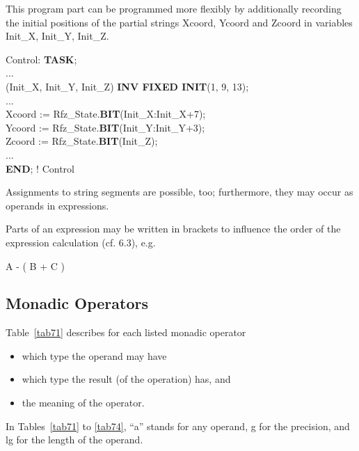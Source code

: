This program part can be programmed more flexibly by additionally
recording the initial positions of the partial strings Xcoord, Ycoord
and Zcoord in variables Init\_X, Init\_Y, Init\_Z.

Control: {\bf TASK};\\
\x ... \\
 (Init\_X, Init\_Y, Init\_Z) {\bf INV FIXED INIT}(1, 9, 13);\\
\x ... \\
\x Xcoord := Rfz\_State.{\bf BIT}(Init\_X:Init\_X+7);\\
\x Ycoord := Rfz\_State.{\bf BIT}(Init\_Y:Init\_Y+3);\\
\x Zcoord := Rfz\_State.{\bf BIT}(Init\_Z);\\
\x ... \\
{\bf END}; ! Control

Assignments to string segments are possible, too; furthermore, they may
occur as operands in expressions.

Parts of an expression may be written in brackets to influence the order
of the expression calculation (cf. 6.3), e.g.

A - ( B + C )

\subsection{Monadic Operators}   %

Table~\ref{tab71} describes for each listed monadic operator
\begin{itemize}
\item which type the operand may have
\item which type the result (of the operation) has, and
\item the meaning of the operator.
\end{itemize}
In Tables~\ref{tab71} to \ref{tab74}, ``a'' stands for any operand, g for the precision, and lg for
the length of the operand.

